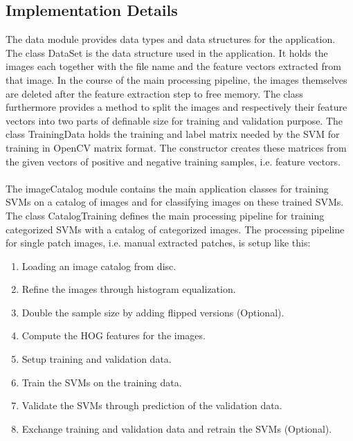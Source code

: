 \subsection{Implementation Details}\label{sec:implem}

The data module provides data types and data structures for the application. The class DataSet is the data structure used in the application. It holds the images each together with the file name and the feature vectors extracted from that image. In the course of the main processing pipeline, the images themselves are deleted after the feature extraction step to free memory. The class furthermore provides a method to split the images and respectively their feature vectors into two parts of definable size for training and validation purpose. The class TrainingData holds the training and label matrix needed by the SVM for training in OpenCV matrix format. The constructor creates these matrices from the given vectors of positive and negative training samples, i.e. feature vectors.
\\
\\
The imageCatalog module contains the main application classes for training SVMs on a catalog of images and for classifying images on these trained SVMs. The class CatalogTraining defines the main processing pipeline for training categorized SVMs with a catalog of categorized images. The processing pipeline for single patch images, i.e. manual extracted patches, is setup like this:

\begin{enumerate}
	\item Loading an image catalog from disc.
	\item Refine the images through histogram equalization.
	\item Double the sample size by adding flipped versions (Optional).
	\item Compute the HOG features for the images.
	\item Setup training and validation data.
	\item Train the SVMs on the training data.
	\item Validate the SVMs through prediction of the validation data.
	\item Exchange training and validation data and retrain the SVMs (Optional).
\end{enumerate}

